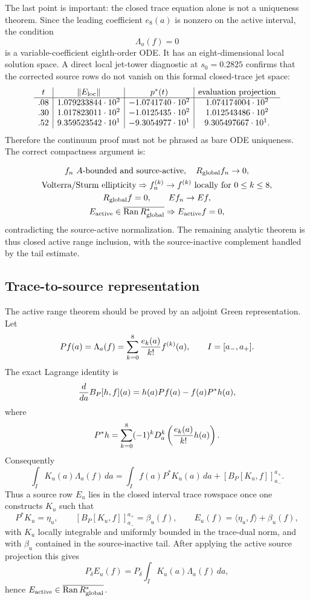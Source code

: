 \documentclass[11pt]{article}
\begin{document}
The last point is important: the closed trace equation alone is not a
uniqueness theorem.  Since the leading coefficient \(e_8(a)\) is nonzero on the
active interval, the condition
\[
  \Lambda_a(f)=0
\]
is a variable-coefficient eighth-order ODE.  It has an eight-dimensional local
solution space.  A direct local jet-tower diagnostic at \(s_0=0.2825\) confirms
that the corrected source rows do not vanish on this formal closed-trace jet
space:
\[
\begin{array}{c|c|c|c}
t&\|E_{\rm loc}\|&p^\ast(t)&\hbox{evaluation projection}\\\hline
.08&1.079233844\cdot10^2&-1.0741740\cdot10^2&1.074174004\cdot10^2\\
.30&1.017823011\cdot10^2&-1.0125435\cdot10^2&1.012543486\cdot10^2\\
.52&9.359523542\cdot10^1&-9.3054977\cdot10^1&9.305497667\cdot10^1.
\end{array}
\]
Therefore the continuum proof must not be phrased as bare ODE uniqueness.
The correct compactness argument is:

\[
\begin{gathered}
f_n\hbox{ \(A\)-bounded and source-active},\quad R_{\rm global}f_n\to0,\\
\hbox{Volterra/Sturm ellipticity}\Rightarrow
  f_n^{(k)}\to f^{(k)}\hbox{ locally for }0\le k\le8,\\
R_{\rm global}f=0,\qquad E f_n\to E f,\\
E_{\rm active}\in\overline{\operatorname{Ran}R_{\rm global}^\ast}
  \Rightarrow E_{\rm active}f=0,
\end{gathered}
\]
contradicting the source-active normalization.  The remaining analytic theorem
is thus closed active range inclusion, with the source-inactive complement
handled by the tail estimate.

\subsection{Trace-to-source representation}

The active range theorem should be proved by an adjoint Green representation.
Let
\[
  P f(a)=\Lambda_a(f)
       = \sum_{k=0}^8 {e_k(a)\over k!} f^{(k)}(a),
  \qquad I=[a_-,a_+].
\]
The exact Lagrange identity is
\[
  {d\over da}B_P[h,f](a)=h(a)P f(a)-f(a)P^\ast h(a),
\]
where
\[
  P^\ast h=\sum_{k=0}^8(-1)^kD_a^k
  \left({e_k(a)\over k!}h(a)\right).
\]
Consequently
\[
  \int_I K_u(a)\Lambda_a(f)\,da
  =\int_I f(a)P^\ast K_u(a)\,da+
    [B_P[K_u,f]]_{a_-}^{a_+}.
\]
Thus a source row \(E_u\) lies in the closed interval trace rowspace once one
constructs \(K_u\) such that
\[
  P^\ast K_u=\eta_u,\qquad
  [B_P[K_u,f]]_{a_-}^{a_+}=\beta_u(f),\qquad
  E_u(f)=\langle\eta_u,f\rangle+\beta_u(f),
\]
with \(K_u\) locally integrable and uniformly bounded in the trace-dual norm,
and with \(\beta_u\) contained in the source-inactive tail.  After applying the
active source projection this gives
\[
  P_\delta E_u(f)
  =P_\delta\int_I K_u(a)\Lambda_a(f)\,da,
\]
hence \(E_{\rm active}\in\overline{\operatorname{Ran}R_{\rm global}^\ast}\).
\end{document}

